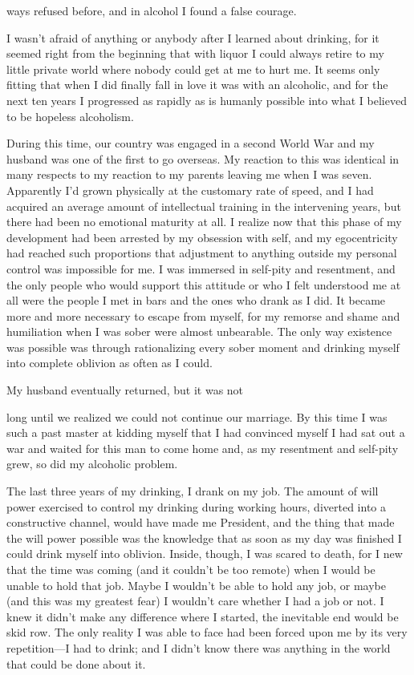 ways refused before, and in alcohol I found a false courage.

I wasn’t afraid of anything or anybody after I learned about drinking, for it seemed right from the beginning that with liquor I could always retire to my little private world where nobody could get at me to hurt me. It seems only fitting that when I did finally fall in love it was with an alcoholic, and for the next ten years I progressed as rapidly as is humanly possible into what I believed to be hopeless alcoholism.

During this time, our country was engaged in a second World War and my husband was one of the first to go overseas. My reaction to this was identical in many respects to my reaction to my parents leaving me when I was seven. Apparently I’d grown physically at the customary rate of speed, and I had acquired an average amount of intellectual training in the intervening years, but there had been no emotional maturity at all. I realize now that this phase of my development had been arrested by my obsession with self, and my egocentricity had reached such proportions that adjustment to anything outside my personal control was impossible for me. I was immersed in self-pity and resentment, and the only people who would support this attitude or who I felt understood me at all were the people I met in bars and the ones who drank as I did. It became more and more necessary to escape from myself, for my remorse and shame and humiliation when I was sober were almost unbearable. The only way existence was possible was through rationalizing every sober moment and drinking myself into complete oblivion as often as I could.

My husband eventually returned, but it was not

long until we realized we could not continue our marriage. By this time I was such a past master at kidding myself that I had convinced myself I had sat out a war and waited for this man to come home and, as my resentment and self-pity grew, so did my alcoholic problem.

The last three years of my drinking, I drank on my job. The amount of will power exercised to control my drinking during working hours, diverted into a constructive channel, would have made me President, and the thing that made the will power possible was the knowledge that as soon as my day was finished I could drink myself into oblivion. Inside, though, I was scared to death, for I new that the time was coming (and it couldn’t be too remote) when I would be unable to hold that job. Maybe I wouldn’t be able to hold any job, or maybe (and this was my greatest fear) I wouldn’t care whether I had a job or not. I knew it didn’t make any difference where I started, the inevitable end would be skid row. The only reality I was able to face had been forced upon me by its very repetition—I had to drink; and I didn’t know there was anything in the world that could be done about it.

